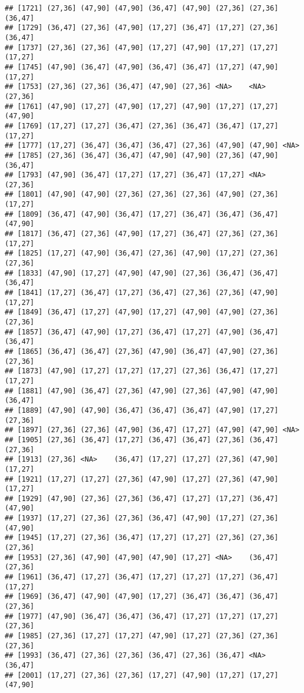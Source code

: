 \documentclass[12pt,]{article}
\begin{document}
\begin{verbatim}
## [1721] (27,36] (47,90] (47,90] (36,47] (47,90] (27,36] (27,36] (36,47]
## [1729] (36,47] (27,36] (47,90] (17,27] (36,47] (17,27] (27,36] (36,47]
## [1737] (27,36] (27,36] (47,90] (17,27] (47,90] (17,27] (17,27] (17,27]
## [1745] (47,90] (36,47] (47,90] (36,47] (36,47] (17,27] (47,90] (17,27]
## [1753] (27,36] (27,36] (36,47] (47,90] (27,36] <NA>    <NA>    (27,36]
## [1761] (47,90] (17,27] (47,90] (17,27] (47,90] (17,27] (17,27] (47,90]
## [1769] (17,27] (17,27] (36,47] (27,36] (36,47] (36,47] (17,27] (17,27]
## [1777] (17,27] (36,47] (36,47] (36,47] (27,36] (47,90] (47,90] <NA>   
## [1785] (27,36] (36,47] (36,47] (47,90] (47,90] (27,36] (47,90] (36,47]
## [1793] (47,90] (36,47] (17,27] (17,27] (36,47] (17,27] <NA>    (27,36]
## [1801] (47,90] (47,90] (27,36] (27,36] (27,36] (47,90] (27,36] (17,27]
## [1809] (36,47] (47,90] (36,47] (17,27] (36,47] (36,47] (36,47] (47,90]
## [1817] (36,47] (27,36] (47,90] (17,27] (36,47] (27,36] (27,36] (17,27]
## [1825] (17,27] (47,90] (36,47] (27,36] (47,90] (17,27] (27,36] (27,36]
## [1833] (47,90] (17,27] (47,90] (47,90] (27,36] (36,47] (36,47] (36,47]
## [1841] (17,27] (36,47] (17,27] (36,47] (27,36] (27,36] (47,90] (17,27]
## [1849] (36,47] (17,27] (47,90] (17,27] (47,90] (47,90] (27,36] (27,36]
## [1857] (36,47] (47,90] (17,27] (36,47] (17,27] (47,90] (36,47] (36,47]
## [1865] (36,47] (36,47] (27,36] (47,90] (36,47] (47,90] (27,36] (27,36]
## [1873] (47,90] (17,27] (17,27] (17,27] (27,36] (36,47] (17,27] (17,27]
## [1881] (47,90] (36,47] (27,36] (47,90] (27,36] (47,90] (47,90] (36,47]
## [1889] (47,90] (47,90] (36,47] (36,47] (36,47] (47,90] (17,27] (27,36]
## [1897] (27,36] (27,36] (47,90] (36,47] (17,27] (47,90] (47,90] <NA>   
## [1905] (27,36] (36,47] (17,27] (36,47] (36,47] (27,36] (36,47] (27,36]
## [1913] (27,36] <NA>    (36,47] (17,27] (17,27] (27,36] (47,90] (17,27]
## [1921] (17,27] (17,27] (27,36] (47,90] (17,27] (27,36] (47,90] (17,27]
## [1929] (47,90] (27,36] (27,36] (36,47] (17,27] (17,27] (36,47] (47,90]
## [1937] (17,27] (27,36] (27,36] (36,47] (47,90] (17,27] (27,36] (47,90]
## [1945] (17,27] (27,36] (36,47] (17,27] (17,27] (27,36] (27,36] (27,36]
## [1953] (27,36] (47,90] (47,90] (47,90] (17,27] <NA>    (36,47] (27,36]
## [1961] (36,47] (17,27] (36,47] (17,27] (17,27] (17,27] (36,47] (17,27]
## [1969] (36,47] (47,90] (47,90] (17,27] (36,47] (36,47] (36,47] (27,36]
## [1977] (47,90] (36,47] (36,47] (36,47] (17,27] (17,27] (17,27] (27,36]
## [1985] (27,36] (17,27] (17,27] (47,90] (17,27] (27,36] (27,36] (27,36]
## [1993] (36,47] (27,36] (27,36] (36,47] (27,36] (36,47] <NA>    (36,47]
## [2001] (17,27] (27,36] (27,36] (17,27] (47,90] (17,27] (17,27] (47,90]

\end{verbatim}
\end{document}
